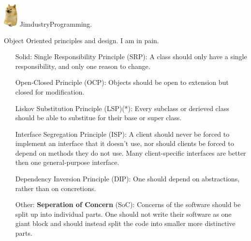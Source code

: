 \documentclass{article}
\begin{document}
\includegraphics[width=2em]{2ljhyisqtna51.png}\newline
{\small Jimdustry\newline Programming.}
\begin{center}
    \vspace*{\fill}
    {\Huge Object Oriented principles and design.}\newline
    {\small I am in pain.}
    \vspace*{\fill}
\end{center}
\newpage

\begin{enumerate}
    \item[\huge{Solid:}]
          {\huge S}ingle Responsibility Principle (SRP):\newline
          A class should only have a single responsibility, and only one reason to change.

              {\huge O}pen-Closed Principle (OCP):\newline
          Objects should be open to extension but closed for modification.

              {\huge L}iskov Substitution Principle (LSP)(*):\newline
          Every subclass or derieved class should be able to substitue
          for their base or super class.

              {\huge I}nterface Segregation Principle (ISP):\newline
          A client should never be forced to implement an interface that it doesn't use, nor
          should clients be forced to depend on methods they do not use. Many
          client-specific interfaces are better then one general-purpose interface.

              {\huge D}ependency Inversion Principle (DIP):\newline
          One should depend on abstractions, rather than on concretions.

    \item[\huge Other:]
          \textbf{Seperation of Concern} (SoC):\newline
          Concerns of the software should be split up into individual parts.
          One should not write their software as one giant block and should instead
          split the code into smaller more distinctive parts.


\end{enumerate}
\end{document}
